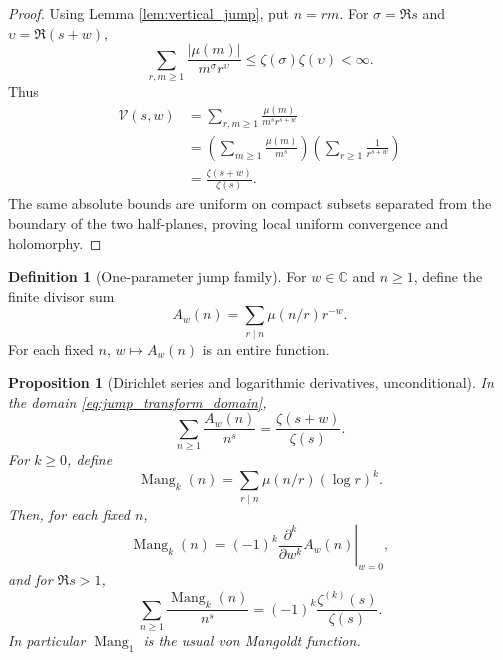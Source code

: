 \documentclass[11pt]{amsart}
\numberwithin{equation}{section}
\theoremstyle{plain}
\newtheorem{proposition}[theorem]{Proposition}
\theoremstyle{definition}
\newtheorem{definition}[theorem]{Definition}
\theoremstyle{remark}
\newcommand{\C}{\mathbb C}
\newcommand{\mob}{\mu}
\begin{document}
\begin{proof}
Using Lemma \ref{lem:vertical_jump}, put $n=rm$.  For $\sigma=\Re s$ and $\upsilon=\Re(s+w)$,
\begin{equation}
\sum_{r,m\ge1}\frac{|\mob(m)|}{m^\sigma r^\upsilon}
\le \zeta(\sigma)\zeta(\upsilon)<\infty.
\label{eq:jump_absolute_bound}
\end{equation}
Thus
\begin{align}
\mathscr V(s,w)
&=\sum_{r,m\ge1}\frac{\mob(m)}{m^s r^{s+w}}
\label{eq:jump_transform_expand}\\
&=\left(\sum_{m\ge1}\frac{\mob(m)}{m^s}\right)
\left(\sum_{r\ge1}\frac1{r^{s+w}}\right)
\label{eq:jump_transform_factor}\\
&=\frac{\zeta(s+w)}{\zeta(s)}.
\label{eq:jump_transform_finish}
\end{align}
The same absolute bounds are uniform on compact subsets separated from the boundary of the two half-planes, proving local uniform convergence and holomorphy.
\end{proof}

\begin{definition}[One-parameter jump family]
\label{def:Aw}
For $w\in\C$ and $n\ge1$, define the finite divisor sum
\begin{equation}
A_w(n)=\sum_{r\mid n}\mob(n/r)r^{-w}.
\label{eq:Aw_definition}
\end{equation}
For each fixed $n$, $w\mapsto A_w(n)$ is an entire function.
\end{definition}

\begin{proposition}[Dirichlet series and logarithmic derivatives, unconditional]
\label{prop:Aw}
In the domain \eqref{eq:jump_transform_domain},
\begin{equation}
\sum_{n\ge1}\frac{A_w(n)}{n^s}=\frac{\zeta(s+w)}{\zeta(s)}.
\label{eq:Aw_dirichlet}
\end{equation}
For $k\ge0$, define
\begin{equation}
\operatorname{Mang}_k(n)=\sum_{r\mid n}\mob(n/r)(\log r)^k.
\label{eq:Mang_definition}
\end{equation}
Then, for each fixed $n$,
\begin{equation}
\operatorname{Mang}_k(n)
=(-1)^k\left.\frac{\partial^k}{\partial w^k}A_w(n)\right|_{w=0},
\label{eq:Mang_from_Aw}
\end{equation}
and for $\Re s>1$,
\begin{equation}
\sum_{n\ge1}\frac{\operatorname{Mang}_k(n)}{n^s}
=(-1)^k\frac{\zeta^{(k)}(s)}{\zeta(s)}.
\label{eq:Mang_dirichlet}
\end{equation}
In particular $\operatorname{Mang}_1$ is the usual von Mangoldt function.
\end{proposition}
\end{document}
